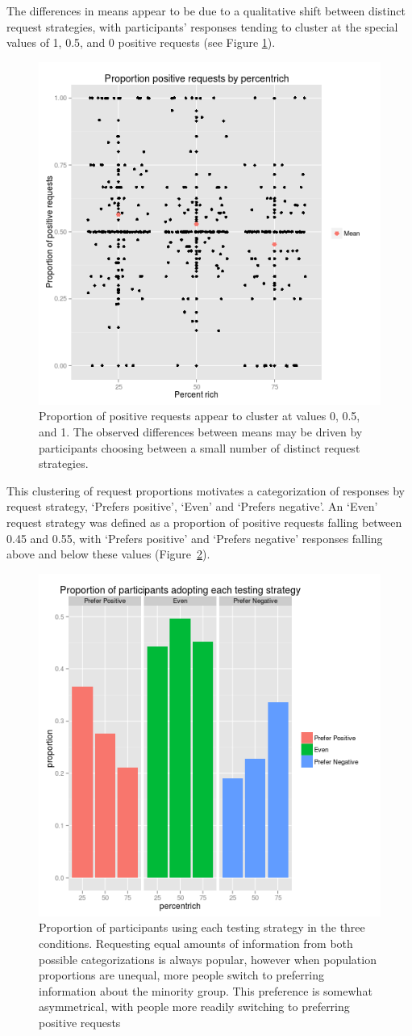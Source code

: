 \documentclass[10pt,letterpaper]{article}
\begin{document}
The differences in means appear to be due to a qualitative shift between distinct request strategies, with participants' responses tending to cluster at the special values of 1, 0.5, and 0 positive requests %
(see Figure \ref{propposdots}).

\begin{figure}[htb]
\includegraphics[width=.5\textwidth]{propposbypcrichdots.png}
\caption{Proportion of positive requests appear to cluster at values 0, 0.5, and 1. The observed differences between means may be driven by participants choosing between a small number of distinct request strategies.}
\label{propposdots}
\end{figure}

This clustering of request proportions motivates a categorization of responses by request strategy, `Prefers positive', `Even' and `Prefers negative'. An `Even' request strategy was defined as a proportion of positive requests falling between 0.45 and 0.55, with `Prefers positive' and `Prefers negative' responses falling above and below these values (Figure~\ref{sidebysidebar3}).

\begin{figure}[htb]
\includegraphics[width=.5\textwidth]{sidebysidebar3.png}
\caption{Proportion of participants using each testing strategy in the three conditions. Requesting equal amounts of information from both possible categorizations is always popular, however when population proportions are unequal, more people switch to preferring information about the minority group. This preference is somewhat asymmetrical, with people more readily switching to preferring positive requests}
\label{sidebysidebar3}
\end{figure}
\end{document}
